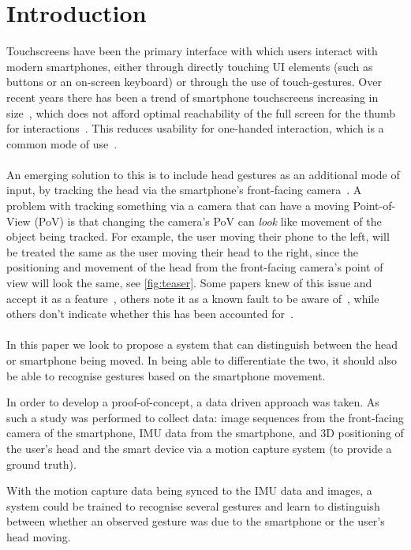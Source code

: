 \section{Introduction}\label{sec:intro} %
Touchscreens have been the primary interface with which users interact with modern smartphones, either through directly touching UI elements (such as buttons or an on-screen keyboard) or through the use of touch-gestures. 
Over recent years there has been a trend of smartphone touchscreens increasing in size~\cite{xuesheng2018research}, which does not afford optimal reachability of the full screen for the thumb for interactions~\cite{le2018fingers}. This reduces usability for one-handed interaction, which is a common mode of use~\cite{hoober2013users}.
\\\\
An emerging solution to this is to include head gestures as an additional mode of input, by tracking the head via the smartphone's front-facing camera~\cite{gorodnichy2004nouse, deepateep2020facial, voelker2020headreach, roig2015face, hansen2006use, francone2011using}.
A problem with tracking something via a camera that can have a moving Point-of-View (PoV) is that changing the camera's PoV can \textit{look} like movement of the object being tracked.
For example, the user moving their phone to the left, will be treated the same as the user moving their head to the right, since the positioning and movement of the head from the front-facing camera's point of view will look the same, see \autoref{fig:teaser}.
Some papers knew of this issue and accept it as a feature~\cite{hansen2006use}, others note it as a known fault to be aware of~\cite{francone2011using, varona2008hands}, while others don't indicate whether this has been accounted for~\cite{gorodnichy2004nouse, deepateep2020facial, voelker2020headreach,roig2015face}.
\\\\
In this paper we look to propose a system that can distinguish between the head or smartphone being moved. In being able to differentiate the two, it should also be able to recognise gestures based on the smartphone movement.

In order to develop a proof-of-concept, a data driven approach was taken.
As such a study was performed to collect data: image sequences from the front-facing camera of the smartphone, IMU data from the smartphone, and 3D positioning of the user's head and the smart device via a motion capture system (to provide a ground truth).

With the motion capture data being synced to the IMU data and images, a system could be trained to recognise several gestures and learn to distinguish between whether an observed gesture was due to the smartphone or the user's head moving.


